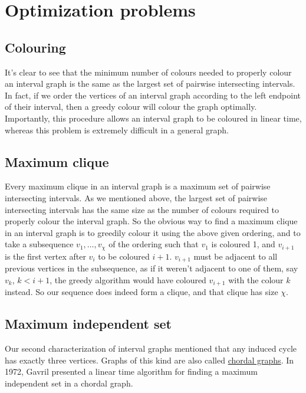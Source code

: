 \documentclass[11pt]{article}
\begin{document}
\section{Optimization problems}
\subsection{Colouring}
It's clear to see that the minimum number of colours needed to properly colour
an interval graph is the same as the largest set of pairwise intersecting
intervals. In fact, if we order the vertices of an interval graph according to
the left endpoint of their interval, then a greedy colour will colour the
graph optimally. Importantly, this procedure allows an interval graph to be
coloured in linear time, whereas this problem is extremely difficult in a
general graph. \cite{Olariu}


\subsection{Maximum clique}
Every maximum clique in an interval graph is a maximum set of pairwise
intersecting intervals. As we mentioned above, the largest set of pairwise
intersecting intervals has the same size as the number of colours required to
properly colour the interval graph. So the obvious way to find a maximum
clique in an interval graph is to greedily colour it using the above given
ordering, and to take a subsequence $v_1,\ldots,v_\chi$ of the ordering such
that $v_1$ is coloured 1, and $v_{i+1}$ is the first vertex after $v_i$ to be
coloured $i+1$. $v_{i+1}$ must be adjacent to all previous vertices in the
subsequence, as if it weren't adjacent to one of them, say $v_k$, $k<i+1$, the
greedy algorithm would have coloured $v_{i+1}$ with the colour $k$ instead. So
our sequence does indeed form a clique, and that clique has size $\chi$.


\subsection{Maximum independent set}
Our second characterization of interval graphs mentioned that any induced
cycle has exactly three vertices. Graphs of this kind are also called
\underline{chordal graphs}. In 1972, Gavril presented a linear time algorithm
for finding a maximum independent set in a chordal graph. \cite{Gavril}
\end{document}
